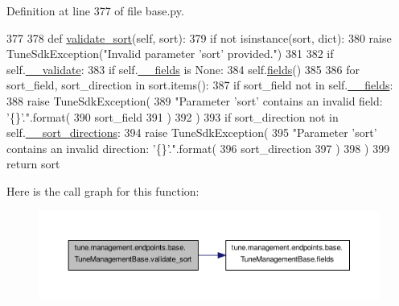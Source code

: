 Definition at line 377 of file base.\-py.


\begin{DoxyCode}
377 
378     \textcolor{keyword}{def }\hyperlink{classtune_1_1management_1_1endpoints_1_1base_1_1TuneManagementBase_af064daad44e8aff9af194ef16b5f3c1a}{validate\_sort}(self, sort):
379         \textcolor{keywordflow}{if} \textcolor{keywordflow}{not} isinstance(sort, dict):
380             \textcolor{keywordflow}{raise} TuneSdkException(\textcolor{stringliteral}{"Invalid parameter 'sort' provided."})
381 
382         \textcolor{keywordflow}{if} self.\hyperlink{classtune_1_1management_1_1endpoints_1_1base_1_1TuneManagementBase_a1cbfd5de3682af94b39f02abfd89e1dc}{\_\_validate}:
383             \textcolor{keywordflow}{if} self.\hyperlink{classtune_1_1management_1_1endpoints_1_1base_1_1TuneManagementBase_ac4a85901e26423540bf102209827a737}{\_\_fields} \textcolor{keywordflow}{is} \textcolor{keywordtype}{None}:
384                 self.\hyperlink{classtune_1_1management_1_1endpoints_1_1base_1_1TuneManagementBase_abf3e64564de650a15b23f5be8b9d8058}{fields}()
385 
386             \textcolor{keywordflow}{for} sort\_field, sort\_direction \textcolor{keywordflow}{in} sort.items():
387                 \textcolor{keywordflow}{if} sort\_field \textcolor{keywordflow}{not} \textcolor{keywordflow}{in} self.\hyperlink{classtune_1_1management_1_1endpoints_1_1base_1_1TuneManagementBase_ac4a85901e26423540bf102209827a737}{\_\_fields}:
388                     \textcolor{keywordflow}{raise} TuneSdkException(
389                         \textcolor{stringliteral}{"Parameter 'sort' contains an invalid field: '\{\}'."}.format(
390                             sort\_field
391                             )
392                         )
393                 \textcolor{keywordflow}{if} sort\_direction \textcolor{keywordflow}{not} \textcolor{keywordflow}{in} self.\hyperlink{classtune_1_1management_1_1endpoints_1_1base_1_1TuneManagementBase_aeffbf18313b470d8d8feec8ee8916aaa}{\_\_sort\_directions}:
394                     \textcolor{keywordflow}{raise} TuneSdkException(
395                         \textcolor{stringliteral}{"Parameter 'sort' contains an invalid direction: '\{\}'."}.format(
396                             sort\_direction
397                             )
398                         )
399         \textcolor{keywordflow}{return} sort

\end{DoxyCode}


Here is the call graph for this function\-:
\nopagebreak
\begin{figure}[H]
\begin{center}
\leavevmode
\includegraphics[width=350pt]{classtune_1_1management_1_1endpoints_1_1base_1_1TuneManagementBase_af064daad44e8aff9af194ef16b5f3c1a_cgraph}
\end{center}
\end{figure}


